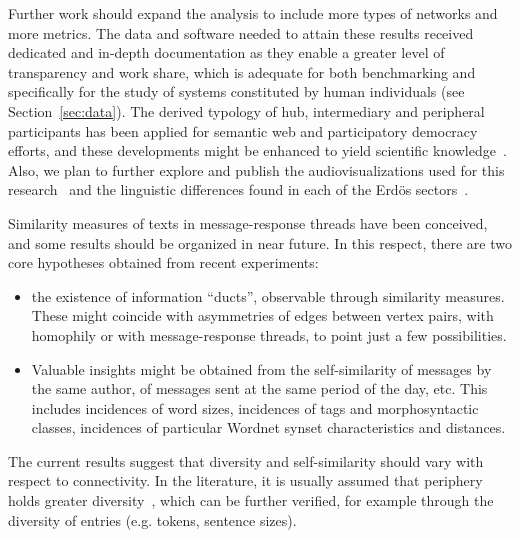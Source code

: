 Further work should expand the analysis to include
more types of networks and more metrics.
The data and software needed to attain these results
received dedicated and in-depth
documentation as they enable a greater level of transparency
and work share,
which is adequate for both benchmarking
and specifically for the study of systems constituted
by human individuals (see Section~\ref{sec:data}).
The derived typology of hub, intermediary and peripheral participants
has been applied for semantic web and participatory democracy efforts,
and these developments might be enhanced to yield scientific knowledge~\cite{pnud4,opa,losd}.
Also, we plan to further explore and publish the audiovisualizations
used for this research~\cite{versinus,animacoes} and
the linguistic differences found in each of the Erd\"os sectors~\cite{rcText}.

Similarity measures of texts in message-response threads have been conceived, 
and some results should be organized in near future.
In this respect, there are two core hypotheses obtained from recent experiments:
\begin{itemize}
\item the existence of information ``ducts'', observable through similarity measures.
These might coincide with asymmetries of edges between vertex pairs,
with homophily or with message-response threads, to point just a few possibilities.
\item Valuable insights might be obtained from the self-similarity of messages by the same author,
of messages sent at the same period of the day, etc.
This includes incidences of word sizes, incidences of tags and morphosyntactic classes,
incidences of particular Wordnet synset characteristics and distances.
\end{itemize}

The current results suggest that diversity and self-similarity should vary with respect to connectivity. In the literature, it is usually assumed 
that periphery holds greater diversity~\cite{easly},
which can be further verified, for example through the diversity of entries (e.g. tokens, sentence sizes).

